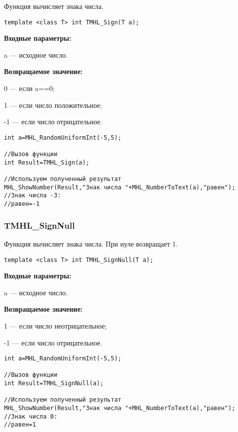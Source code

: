 \documentclass[a4paper,12pt]{article}
\begin{document}
Функция вычисляет знака числа.


\begin{lstlisting}[label=code_syntax_TMHL_Sign,caption=Синтаксис]
template <class T> int TMHL_Sign(T a);
\end{lstlisting}

\textbf{Входные параметры:}

 a --- исходное число.

\textbf{Возвращаемое значение:}

 0 --- если a==0;
 
 1 --- если число положительное;
 
 -1 --- если число отрицательное.


\begin{lstlisting}[label=code_use_TMHL_Sign,caption=Пример использования]
int a=MHL_RandomUniformInt(-5,5);

//Вызов функции
int Result=TMHL_Sign(a);

//Используем полученный результат
MHL_ShowNumber(Result,"Знак числа "+MHL_NumberToText(a),"равен");
//Знак числа -3:
//равен=-1
\end{lstlisting}

\subsubsection{TMHL\_SignNull}\label{TMHL_SignNull}

Функция вычисляет знака числа. При нуле возвращает 1.


\begin{lstlisting}[label=code_syntax_TMHL_SignNull,caption=Синтаксис]
template <class T> int TMHL_SignNull(T a);
\end{lstlisting}

\textbf{Входные параметры:}

 a --- исходное число.

\textbf{Возвращаемое значение:}

 1 --- если число неотрицательное;
 
 -1 --- если число отрицательное.


\begin{lstlisting}[label=code_use_TMHL_SignNull,caption=Пример использования]
int a=MHL_RandomUniformInt(-5,5);

//Вызов функции
int Result=TMHL_SignNull(a);

//Используем полученный результат
MHL_ShowNumber(Result,"Знак числа "+MHL_NumberToText(a),"равен");
//Знак числа 0:
//равен=1
\end{lstlisting}
\end{document}
